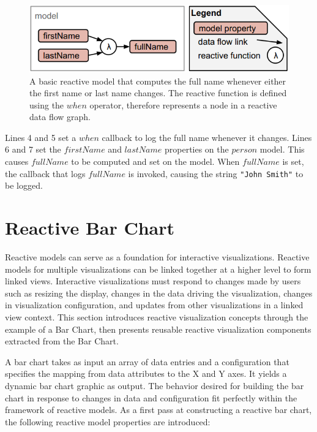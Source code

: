\begin{figure}
  \centering
  \includegraphics[width=\figureWidth]{figs/names.png}
  \caption [Full Name Reactive Model Example]{A basic reactive model that computes the full name whenever either the first name or last name changes. The reactive function is defined using the $when$ operator, therefore represents a node in a reactive data flow graph. }
  \label{fig:fullNameFlow}
\end{figure}

Lines 4 and 5 set a $when$ callback to log the full name whenever it changes. Lines 6 and 7 set the $firstName$ and $lastName$ properties on the $person$ model. This causes $fullName$ to be computed and set on the model. When $fullName$ is set, the callback that logs $fullName$ is invoked, causing the string \verb`"John Smith"` to be logged.

\section{Reactive Bar Chart} \label{reactiveBarChart}
Reactive models can serve as a foundation for interactive visualizations. Reactive models for multiple visualizations can be linked together at a higher level to form linked views. Interactive visualizations must respond to changes made by users such as resizing the display, changes in the data driving the visualization, changes in visualization configuration, and updates from other visualizations in a linked view context. This section introduces reactive visualization concepts through the example of a Bar Chart, then presents reusable reactive visualization components extracted from the Bar Chart.

A bar chart takes as input an array of data entries and a configuration that specifies the mapping from data attributes to the X and Y axes. It yields a dynamic bar chart graphic as output. The behavior desired for building the bar chart in response to changes in data and configuration fit perfectly within the framework of reactive models. As a first pass at constructing a reactive bar chart, the following reactive model properties are introduced:

